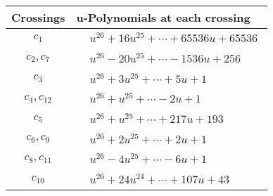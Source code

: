 \documentclass[1p]{elsarticle_modified}
\theoremstyle{definition}
\begin{document}
\begin{tabular}{m{50pt}|m{274pt}}
Crossings & \hspace{64pt}u-Polynomials at each crossing \\
\hline $$\begin{aligned}c_{1}\end{aligned}$$&$\begin{aligned}
&u^{26}+16 u^{25}+\cdots+65536 u+65536
\end{aligned}$\\
\hline $$\begin{aligned}c_{2},c_{7}\end{aligned}$$&$\begin{aligned}
&u^{26}-20 u^{25}+\cdots-1536 u+256
\end{aligned}$\\
\hline $$\begin{aligned}c_{3}\end{aligned}$$&$\begin{aligned}
&u^{26}+3 u^{25}+\cdots+5 u+1
\end{aligned}$\\
\hline $$\begin{aligned}c_{4},c_{12}\end{aligned}$$&$\begin{aligned}
&u^{26}+u^{25}+\cdots-2 u+1
\end{aligned}$\\
\hline $$\begin{aligned}c_{5}\end{aligned}$$&$\begin{aligned}
&u^{26}+u^{25}+\cdots+217 u+193
\end{aligned}$\\
\hline $$\begin{aligned}c_{6},c_{9}\end{aligned}$$&$\begin{aligned}
&u^{26}+2 u^{25}+\cdots+2 u+1
\end{aligned}$\\
\hline $$\begin{aligned}c_{8},c_{11}\end{aligned}$$&$\begin{aligned}
&u^{26}-4 u^{25}+\cdots-6 u+1
\end{aligned}$\\
\hline $$\begin{aligned}c_{10}\end{aligned}$$&$\begin{aligned}
&u^{26}+24 u^{24}+\cdots+107 u+43
\end{aligned}$\\
\hline
\end{tabular}\\~\\
\end{document}

